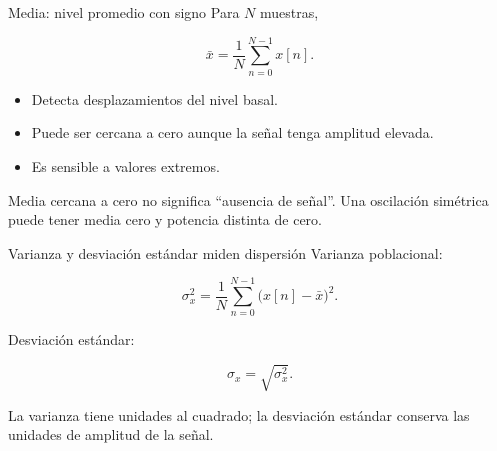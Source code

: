 \documentclass[
  ignorenonframetext,
  aspectratio=169,
  spanish,
  professionalfonts]{beamer}
\providecommand{\tightlist}{%
  \setlength{\itemsep}{0pt}\setlength{\parskip}{0pt}}
\begin{document}
\begin{frame}{Media: nivel promedio con signo}
\protect{}\label{media-nivel-promedio-con-signo}
Para \(N\) muestras,

\[
\bar{x}=\frac{1}{N}\sum_{n=0}^{N-1}x[n].
\]

\begin{itemize}
\tightlist
\item
  Detecta desplazamientos del nivel basal.
\item
  Puede ser cercana a cero aunque la señal tenga amplitud elevada.
\item
  Es sensible a valores extremos.
\end{itemize}

\begin{tcolorbox}[enhanced jigsaw, arc=.35mm, bottomrule=.15mm, bottomtitle=1mm, breakable, colback=white, colbacktitle=quarto-callout-warning-color!10!white, colframe=quarto-callout-warning-color-frame, coltitle=black, left=2mm, leftrule=.75mm, opacityback=0, opacitybacktitle=0.6, rightrule=.15mm, title={Error frecuente}, titlerule=0mm, toprule=.15mm, toptitle=1mm]

Media cercana a cero no significa ``ausencia de señal''. Una oscilación
simétrica puede tener media cero y potencia distinta de cero.

\end{tcolorbox}
\end{frame}

\begin{frame}{Varianza y desviación estándar miden dispersión}
\protect{}\label{varianza-y-desviaciuxf3n-estuxe1ndar-miden-dispersiuxf3n}
Varianza poblacional:

\[
\sigma_x^2=\frac{1}{N}\sum_{n=0}^{N-1}\big(x[n]-\bar{x}\big)^2.
\]

Desviación estándar:

\[
\sigma_x=\sqrt{\sigma_x^2}.
\]

\begin{tcolorbox}[enhanced jigsaw, arc=.35mm, bottomrule=.15mm, bottomtitle=1mm, breakable, colback=white, colbacktitle=quarto-callout-note-color!10!white, colframe=quarto-callout-note-color-frame, coltitle=black, left=2mm, leftrule=.75mm, opacityback=0, opacitybacktitle=0.6, rightrule=.15mm, title={Interpretación}, titlerule=0mm, toprule=.15mm, toptitle=1mm]

La varianza tiene unidades al cuadrado; la desviación estándar conserva
las unidades de amplitud de la señal.

\end{tcolorbox}
\end{frame}
\end{document}
